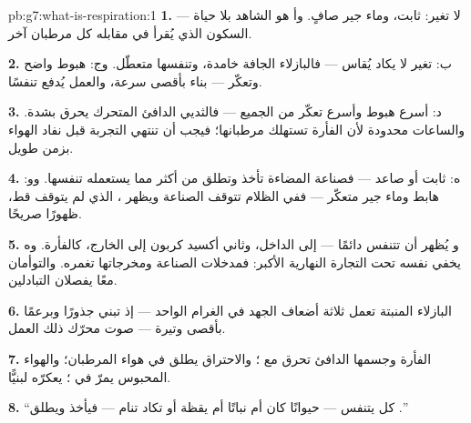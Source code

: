 \begin{solution}{pb:g7:what-is-respiration:1}
\textbf{1.} لا تغير:  ثابت، وماء جير صافٍ. وأ هو الشاهد بلا
حياة --- السكون الذي يُقرأ في مقابله كل مرطبان آخر.

\textbf{2.} ب: تغير لا يكاد يُقاس --- فالبازلاء الجافة خامدة،
وتنفسها متعطّل. وج: هبوط  واضح وتعكّر ---  بناء
بأقصى سرعة، والعمل يُدفع تنفسًا.

\textbf{3.} د: أسرع هبوط وأسرع تعكّر من الجميع --- فالثديي الدافئ
المتحرك يحرق بشدة. والساعات محدودة لأن الفأرة تستهلك 
مرطبانها؛ فيجب أن تنتهي التجربة قبل نفاد الهواء بزمن طويل.

\textbf{4.} ه:  ثابت أو صاعد --- فصناعة  المضاءة
تأخذ  وتطلق من  أكثر مما يستعمله تنفسها.
وو:  هابط وماء جير متعكّر --- ففي الظلام تتوقف الصناعة ويظهر
، الذي لم يتوقف قط، ظهورًا صريحًا.

\textbf{5.} و يُظهر أن  تتنفس دائمًا ---  إلى الداخل،
وثاني أكسيد كربون إلى الخارج، كالفأرة. وه يخفي  نفسه تحت
التجارة النهارية الأكبر: فمدخلات الصناعة ومخرجاتها تغمره. والتوأمان
معًا يفصلان التبادلين.

\textbf{6.} البازلاء المنبتة تعمل ثلاثة أضعاف الجهد في الغرام
الواحد --- إذ تبني جذورًا وبرعمًا بأقصى وتيرة ---  صوت محرّك
ذلك العمل.

\textbf{7.}  الفأرة وجسمها الدافئ تحرق  مع ؛
والاحتراق يطلق  في هواء المرطبان؛ والهواء المحبوس
يمرّ في ؛  يعكرّه لبنيًّا.

\textbf{8.} ``كل  يتنفس --- حيوانًا كان أم نباتًا أم 
يقظة أو تكاد تنام --- فيأخذ  ويطلق .''


\end{solution}
